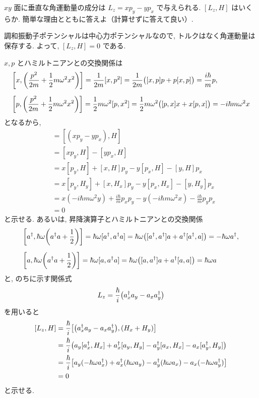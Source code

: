 \documentclass[../../ou-physics-exam.tex]{subfiles}
\begin{document}
$ xy $ 面に垂直な角運動量の成分は $ L_z = xp_y - yp_x $ で与えられる. 
$ [L_z, H] $ はいくらか. 
簡単な理由とともに答えよ（計算せずに答えて良い）.
\begin{answer}
    調和振動子ポテンシャルは中心力ポテンシャルなので, トルクはなく角運動量は保存する. 
    よって, $ [L_z, H] = 0 $ である.
\end{answer}
\begin{supplement}
    $ x, p $ とハミルトニアンとの交換関係は
    \begin{align*}
        & \qty[x, \qty(\frac{p^2}{2m} + \frac{1}{2} m \omega^2 x^2)] = \frac{1}{2m} [x, p^2] = \frac{1}{2m} \big([x, p]p + p[x, p] \big) = \frac{i \hbar}{m} p, \\[2mm]
        & \qty[p, \qty(\frac{p^2}{2m} + \frac{1}{2} m \omega^2 x^2)] = \frac{1}{2} m \omega^2 [p, x^2] = \frac{1}{2} m \omega^2 \big([p, x]x + x[p, x] \big) = -i \hbar m \omega^2 x
    \end{align*}
    となるから,
    \begin{align*}
        [L_z, H] 
        & = [(xp_y - yp_x), H] \\
        & = [xp_y, H] - [yp_x, H] \\
        & = x[p_y, H] + [x, H]p_y - y[p_x, H] - [y, H]p_x \\
        & = x[p_y, H_y] + [x, H_x]p_y - y[p_x, H_x] -[y, H_y]p_x \\
        & = x (-i \hbar m \omega^2 y) + \frac{i \hbar}{m} p_x p_y - y (-i \hbar m \omega^2 x) - \frac{i \hbar}{m} p_yp_x \\
        & = 0
    \end{align*}
    と示せる. 
    あるいは, 昇降演算子とハミルトニアンとの交換関係
    \begin{align*}
        & \qty[a^{\dagger}, \hbar \omega \qty(a^{\dagger} a + \frac{1}{2})] = \hbar \omega [a^{\dagger}, a^{\dagger} a] = \hbar \omega \qty([a^{\dagger}, a^{\dagger}] a + a^{\dagger} [a^{\dagger}, a]) = - \hbar \omega a^{\dagger}, \\[2mm]
        & \qty[a, \hbar \omega \qty(a^{\dagger} a + \frac{1}{2})] = \hbar \omega [a, a^{\dagger} a] = \hbar \omega \qty([a, a^{\dagger}] a + a^{\dagger} [a, a]) = \hbar \omega a
    \end{align*}
    と, のちに示す関係式
    \begin{align*}
        L_z = \frac{\hbar}{i} \qty(a_x^{\dagger} a_y - a_x a_y^{\dagger})
    \end{align*}
    を用いると
    \begin{align*}
        \qty[L_z, H] 
        & = \frac{\hbar}{i} \qty[\qty(a_x^{\dagger} a_y - a_x a_y^{\dagger}), \qty(H_x + H_y)] \\
        & = \frac{\hbar}{i} \big(a_y [a_x^{\dagger}, H_x] + a_x^{\dagger} [a_y, H_y] - a_y^{\dagger} [a_x, H_x] - a_x [a_y^{\dagger}, H_y] \big) \\
        & = \frac{\hbar}{i} \qty[a_y (- \hbar \omega a_x^{\dagger}) + a_x^{\dagger} (\hbar \omega a_y) - a_y^{\dagger} (\hbar \omega a_x) - a_x (- \hbar \omega a_y^{\dagger})] \\
        & = 0
    \end{align*}
    と示せる.
\end{supplement}
\end{document}

